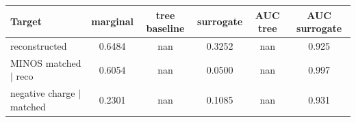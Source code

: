 \begin{tabular}{lccccc}
\toprule
Target & marginal & tree baseline & surrogate & AUC tree & AUC surrogate \\
\midrule
reconstructed & 0.6484 & nan & 0.3252 & nan & 0.925 \\
MINOS matched $\mid$ reco & 0.6054 & nan & 0.0500 & nan & 0.997 \\
negative charge $\mid$ matched & 0.2301 & nan & 0.1085 & nan & 0.931 \\
\bottomrule
\end{tabular}
